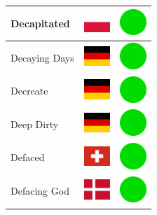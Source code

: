 \documentclass[12pt, a4paper, twoside]{report}
\begin{document}
\begin{center}
\begin{longtable}{|p{5cm}|p{2cm}|p{2cm}|}
 Decapitated                                                & \includegraphics[width=1cm]{../img/flags/pl} &   \includegraphics[width=1cm]{../likes/y} \\ \hline
 Decaying Days                                              & \includegraphics[width=1cm]{../img/flags/de} &   \includegraphics[width=1cm]{../likes/y} \\ \hline
 Decreate                                                   & \includegraphics[width=1cm]{../img/flags/de} &   \includegraphics[width=1cm]{../likes/y} \\ \hline
 Deep Dirty                                                 & \includegraphics[width=1cm]{../img/flags/de} &   \includegraphics[width=1cm]{../likes/y} \\ \hline
 Defaced                                                    & \includegraphics[width=1cm]{../img/flags/ch} &   \includegraphics[width=1cm]{../likes/y} \\ \hline
 Defacing God                                               & \includegraphics[width=1cm]{../img/flags/dk} &   \includegraphics[width=1cm]{../likes/y} \\ \hline

\end{longtable}
\end{center}
\end{document}
